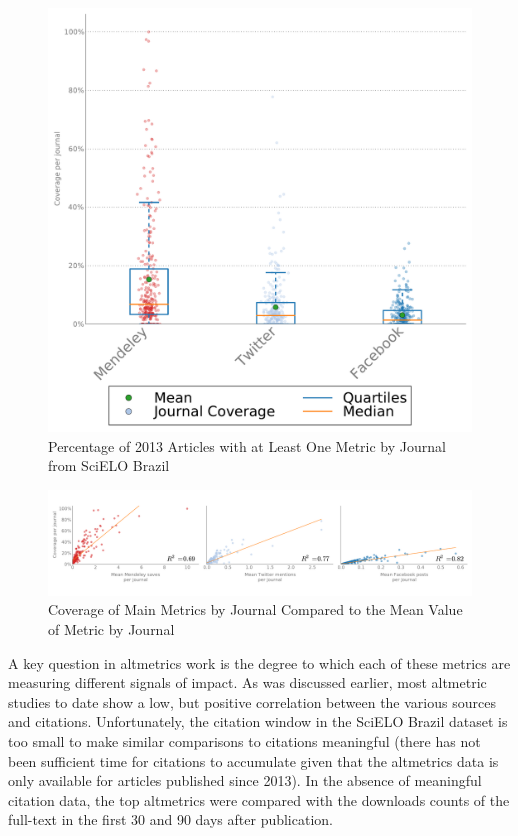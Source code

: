 \begin{figure}[htbp]
\centering
\includegraphics[keepaspectratio,width=\textwidth,height=0.45\textheight]{figures/altmetrics_coverage_scielo_br.pdf}
\caption{Percentage of 2013 Articles with at Least One Metric by Journal from SciELO Brazil}
\label{altmetrics_coverage_scielo_br}
\end{figure}

\begin{figure}[htbp]
\centering
\includegraphics[keepaspectratio,width=\textwidth,height=0.75\textheight]{figures/altmetrics_coverage_v_mean_scielo_br.pdf}
\caption{Coverage of Main Metrics by Journal Compared to the Mean Value of Metric by Journal}
\label{altmetrics_coverage_v_mean_scielo_br}
\end{figure}

A key question in altmetrics work is the degree to which each of these metrics are measuring different signals of impact. As was discussed earlier, most altmetric studies to date show a low, but positive correlation between the various sources and citations. Unfortunately, the citation window in the SciELO Brazil dataset is too small to make similar comparisons to citations meaningful (there has not been sufficient time for citations to accumulate given that the altmetrics data is only available for articles published since 2013). In the absence of meaningful citation data, the top altmetrics were compared with the downloads counts of the full-text in the first 30 and 90 days after publication.

